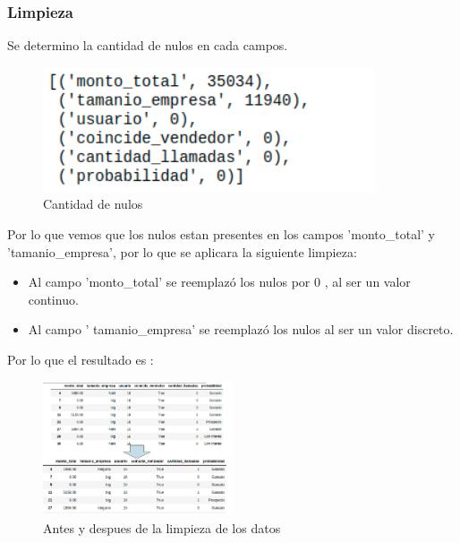 \documentclass[conference]{IEEEtran}
\begin{document}
\subsubsection{Limpieza}
Se determino la cantidad de nulos en cada campos.
\begin{figure}[H]
    \centering
    \includegraphics[scale=0.5]{preprocesamiento/cantidad_nulos}
    \caption{Cantidad de nulos}
    \label{fig:cantidad_nulos}
\end{figure}
Por lo que vemos que los nulos estan presentes en los campos
'monto\_total' y 'tamanio\_empresa', por lo que se aplicara la siguiente limpieza:
\begin{itemize}
    \item Al campo 'monto\_total' se reemplazó los nulos por 0 , al ser un valor continuo.
    \item Al campo '    tamanio\_empresa' se reemplazó los nulos al ser un valor discreto.
\end{itemize}

Por lo que el resultado es : 
\begin{figure}[H]
    \centering
    \includegraphics[width=0.5\textwidth]{preprocesamiento/antes_despues_limpieza}
    \caption{Antes y despues de la limpieza de los datos}
    \label{fig:antes_despues_limpieza}
\end{figure}
\end{document}
